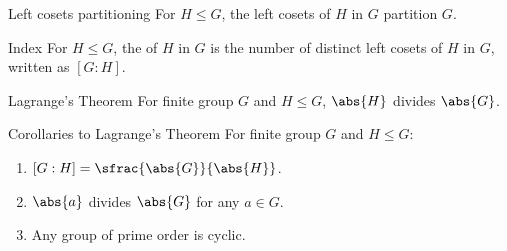 \begin{thmbox}{Left cosets partitioning}
    For $H \leq G$, the left cosets of $H$ in $G$ partition $G$.
\end{thmbox}

\begin{dfnbox}{Index}{}
    For $H \leq G$, the  of $H$ in $G$ is the number of distinct left cosets of $H$ in $G$, written as $[G : H]$.
\end{dfnbox}

\begin{thmbox}{Lagrange's Theorem}{}
    For finite group $G$ and $H \leq G$, $\abs{H}$ divides $\abs{G}$.
\end{thmbox}

\begin{corbox}{Corollaries to Lagrange's Theorem}{}
    For finite group $G$ and $H \leq G$:
    \begin{enumerate}
        \item $[G : H] = \sfrac{\abs{G}}{\abs{H}}$.
        \item $\abs{a}$ divides $\abs{G}$ for any $a \in G$.
        \item Any group of prime order is cyclic.
    \end{enumerate}
\end{corbox}






